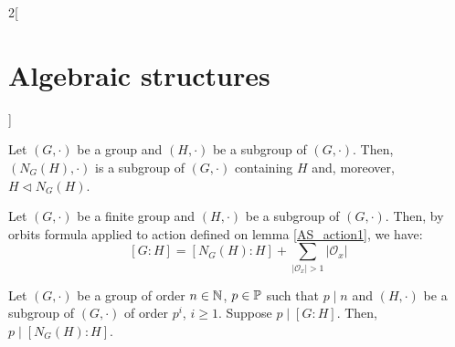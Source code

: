 \documentclass[../../../main.tex]{subfiles}
\begin{document}
\begin{multicols}{2}[\section{Algebraic structures}]
\begin{definition}
  \end{definition}
  \begin{lemma}
    Let $(G,\cdot)$ be a group and $(H,\cdot)$ be a subgroup of $(G,\cdot)$. Then, $(N_G(H),\cdot)$ is a subgroup of $(G,\cdot)$ containing $H$ and, moreover, $H\lhd N_G(H)$.
  \end{lemma}
  \begin{corollary}
    Let $(G,\cdot)$ be a finite group and $(H,\cdot)$ be a subgroup of $(G,\cdot)$. Then, by orbits formula applied to action defined on lemma \ref{AS_action1}, we have: $$[G:H]=[N_G(H):H]+\sum_{|\mathcal{O}_x|>1}|\mathcal{O}_x|$$
  \end{corollary}
  \begin{prop}
    Let $(G,\cdot)$ be a group of order $n\in\mathbb{N} $, $p\in\mathbb{P}$ such that $p\mid n$ and $(H,\cdot)$ be a subgroup of $(G,\cdot)$ of order $p^i$, $i\geq 1$. Suppose $p\mid[G:H]$. Then, $p\mid[N_G(H):H]$.
  \end{prop}

\end{multicols}
\end{document}
